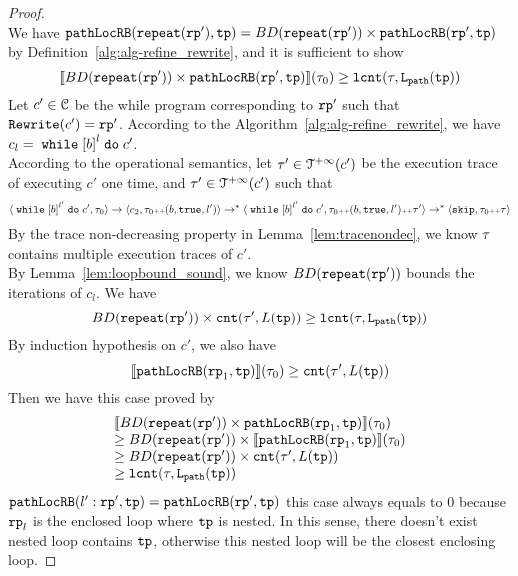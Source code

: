 \begin{proof}
\\
We have $\mathtt{pathLocRB}(\mathtt{repeat}(\mathtt{rp}'), \mathtt{tp}) = BD(\mathtt{repeat}(\mathtt{rp}')) \times \mathtt{pathLocRB}(\mathtt{rp}', \mathtt{tp})$
by Definition~\ref{alg:alg-refine_rewrite}, and
it is sufficient to show
\[
  \llbracket  BD(\mathtt{repeat}(\mathtt{rp}')) \times \mathtt{pathLocRB}(\mathtt{rp}', \mathtt{tp}) \rrbracket (\mathtt{\tau}_0) \geq \mathtt{lcnt}(\mathtt{\tau}, \mathtt{L}_{\mathtt{path}}(\mathtt{tp})) 
\]
Let $c' \in \mathcal{C}$ be the while program corresponding to $\mathtt{rp}'$ such that $\mathtt{Rewrite}(c') = \mathtt{rp}'$.
According to the Algorithm~\ref{alg:alg-refine_rewrite}, we have $c_l = \ewhile \clabel{\bexpr}^{l} \edo c'$.
\\
According to the operational semantics, let $\mathtt{\tau}' \in \mathcal{T}^{+\infty}(c')$ be the execution trace of executing $c'$ one time,
and $\mathtt{\tau}' \in \mathcal{T}^{+\infty}(c')$  such that 
\[
  \config{\ewhile \clabel{\bexpr}^{l'} \edo c', \trace_0} \to \config{c_2, \trace_0 \tracecat (\bexpr, \etrue, l')} \to^* \config{\ewhile \clabel{\bexpr}^{l'} \edo c', \trace_0 \tracecat (\bexpr, \etrue, l') \tracecat \trace'}
  \to^* \config{\eskip, \trace_0 \tracecat \trace}
\]
By the trace non-decreasing property in Lemma~\ref{lem:tracenondec}, we know $\mathtt{\tau}$ contains multiple execution traces of $c'$.
\\
By Lemma~\ref{lem:loopbound_sound}, we know $BD(\mathtt{repeat}(\mathtt{rp}'))$ bounds the iterations of $c_l$. We have
\[
  BD(\mathtt{repeat}(\mathtt{rp}')) \times \mathtt{cnt}(\mathtt{\tau}', L(\mathtt{tp}))  \geq \mathtt{lcnt}(\mathtt{\tau}, \mathtt{L}_{\mathtt{path}}(\mathtt{tp})) 
\]
By induction hypothesis on $c'$, we also have
\[
  \llbracket \mathtt{pathLocRB}(\mathtt{rp}_1, \mathtt{tp}) \rrbracket(\mathtt{\tau}_0) \geq \mathtt{cnt}(\mathtt{\tau}', L(\mathtt{tp})) 
\]
Then we have this case proved by
\[
  \begin{array}{l}
  \llbracket BD(\mathtt{repeat}(\mathtt{rp}')) \times \mathtt{pathLocRB}(\mathtt{rp}_1, \mathtt{tp}) \rrbracket(\mathtt{\tau}_0) 
  \\
  \geq
  BD(\mathtt{repeat}(\mathtt{rp}')) \times \llbracket \mathtt{pathLocRB}(\mathtt{rp}_1, \mathtt{tp}) \rrbracket(\mathtt{\tau}_0) 
  \\
  \geq BD(\mathtt{repeat}(\mathtt{rp}')) \times \mathtt{cnt}(\mathtt{\tau}', L(\mathtt{tp}))  
  \\
  \geq \mathtt{lcnt}(\mathtt{\tau}, \mathtt{L}_{\mathtt{path}}(\mathtt{tp})) 
  \end{array}
  \]
$\mathtt{pathLocRB}(l': \mathtt{rp}', \mathtt{tp}) = \mathtt{pathLocRB}(\mathtt{rp}', \mathtt{tp})$ 
this case always equals to $0$ because $\mathtt{rp}_l$ is the enclosed loop where $\mathtt{tp}$ is nested. In this sense, there doesn't exist nested loop contains $\mathtt{tp}$, otherwise this nested loop will be the closest enclosing loop.

\end{proof}